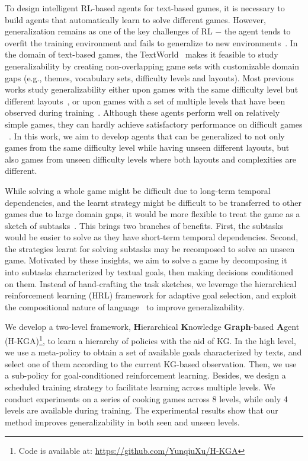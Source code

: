 \documentclass[11pt]{article}
\begin{document}
To design intelligent RL-based agents for text-based games, it is necessary to build agents that automatically learn to solve different games.
However, generalization remains as one of the key challenges of RL $-$ the agent tends to overfit the training environment and fails to generalize to new environments~\cite{cobbe2019rlgeneralization}. 
In the domain of text-based games, the TextWorld~\cite{cote2018textworld} makes it feasible to study generalizability by creating non-overlapping game sets with customizable domain gaps (e.g., themes, vocabulary sets, difficulty levels and layouts).
Most previous works study generalizability either upon games with the same difficulty level but different layouts~\cite{ammanabrolu2019kgdqn}, or upon games with a set of multiple levels that have been observed during training~\cite{adolphs2019ledeepchef}. 
Although these agents perform well on relatively simple games, they can hardly achieve satisfactory performance on difficult games ~\cite{adhikari2020gatav2}.
In this work, we aim to develop agents that can be generalized to not only games from the same difficulty level while having unseen different layouts, but also games from unseen difficulty levels where both layouts and complexities are different. 


While solving a whole game might be difficult due to long-term temporal dependencies, and the learnt strategy might be difficult to be transferred to other games due to large domain gaps, it would be more flexible to treat the game as a sketch of subtasks~\cite{andreas2017modular,oh2017zero}.
This brings two branches of benefits. 
First, the subtasks would be easier to solve as they have short-term temporal dependencies. 
Second, the strategies learnt for solving subtasks may be recomposed to solve an unseen game.
Motivated by these insights, we aim to solve a game by decomposing it into subtasks characterized by textual goals, then making decisions conditioned on them.
Instead of hand-crafting the task sketches, we leverage the hierarchical reinforcement learning (HRL) framework for adaptive goal selection, and exploit the compositional nature of language~\cite{jiang2019hrl} to improve generalizability. 

We develop a two-level framework, \textbf{H}ierarchical \textbf{K}nowledge \textbf{Graph}-based \textbf{A}gent (H-KGA)\footnote{Code is available at: \url{https://github.com/YunqiuXu/H-KGA}}, to learn a hierarchy of policies with the aid of KG. 
In the high level, we use a meta-policy to obtain a set of available goals characterized by texts, and select one of them according to the current KG-based observation.
Then, we use a sub-policy for goal-conditioned reinforcement learning. 
Besides, we design a scheduled training strategy to facilitate learning across multiple levels. 
We conduct experiments on a series of cooking games across 8 levels, while only 4 levels are available during training.
The experimental results show that our method improves generalizability in both seen and unseen levels. 
\end{document}
